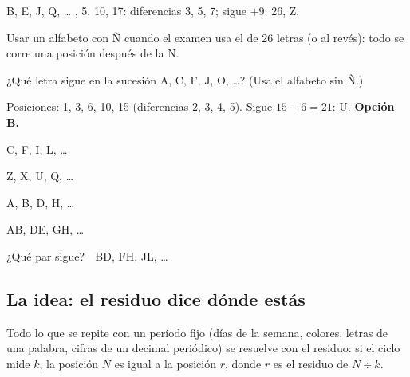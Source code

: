 \begin{ejemplo}
B, E, J, Q, …
, 5, 10, 17: diferencias 3, 5, 7; sigue $+9$: 26, Z.
\end{ejemplo}

\begin{trampa}
Usar un alfabeto con Ñ cuando el examen usa el de 26 letras (o al revés): todo se corre una posición después de la N.
\end{trampa}

\begin{reto}
¿Qué letra sigue en la sucesión A, C, F, J, O, …? (Usa el alfabeto sin Ñ.)
\end{reto}

\begin{retoresuelto}
Posiciones: 1, 3, 6, 10, 15 (diferencias 2, 3, 4, 5). Sigue $15 + 6 = 21$: U. \textbf{Opción B.}
\end{retoresuelto}

\taller
{}
\begin{ejercicios}[2]
\item C, F, I, L, … 
\item Z, X, U, Q, … 
\item A, B, D, H, … 
\item AB, DE, GH, … 
\end{ejercicios}
\begin{ejercicios}
\item ¿Qué par sigue? $\;$ BD, FH, JL, …
\end{ejercicios}

\bitacora


\subsection{La idea: el residuo dice dónde estás}
Todo lo que se repite con un período fijo (días de la semana, colores, letras de una palabra, cifras de un decimal
periódico) se resuelve con el residuo: si el ciclo mide $k$, la posición $N$ es igual a la posición $r$, donde $r$ es el
residuo de $N \div k$.


